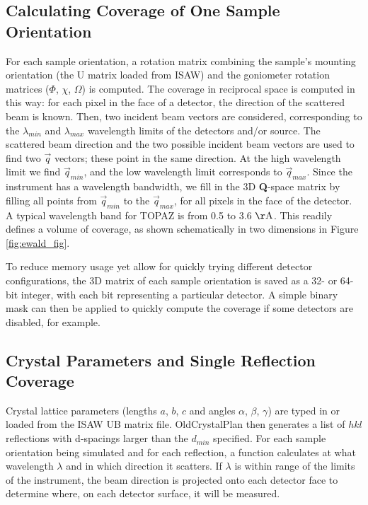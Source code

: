 \documentclass[final]{iucr}              %
\newcommand{\ang}{$\mathrm{\AA} $}
\begin{document}
\subsection{Calculating Coverage of One Sample Orientation}

For each sample orientation, a rotation matrix combining the sample's mounting
orientation (the U matrix loaded from ISAW) and the goniometer rotation matrices
($\Phi$, $\chi$, $\Omega$) is computed. The coverage in reciprocal space is
computed in this way: for each pixel in the face of a detector, the direction of
the scattered beam is known. Then, two incident beam vectors are considered,
corresponding to the $\lambda_{min}$ and $\lambda_{max}$ wavelength limits
of the detectors and/or source. The scattered beam direction and the two possible incident beam vectors
are used to find two $\overrightarrow q$ vectors; these point in the
same direction. At the high wavelength limit we find $\overrightarrow q_{min}$,
and the low wavelength limit corresponds to $\overrightarrow
q_{max}$. Since the instrument has a wavelength bandwidth, we fill in the 3D {\bf Q}-space
matrix by filling all points from $\overrightarrow q_{min}$ to the 
$\overrightarrow q_{max}$, for all pixels in the face of the detector.
A typical wavelength band for TOPAZ is from 0.5 to 3.6 \ang.
This readily defines a volume of coverage, as shown schematically in
two dimensions in Figure \ref{fig:ewald_fig}.


To reduce memory usage yet allow for quickly trying different detector
configurations, the 3D matrix of each sample orientation is saved as a 32- or
64-bit integer, with each bit representing a particular detector. A simple
binary mask can then be applied to quickly compute the coverage if some
detectors are disabled, for example.          




\subsection{Crystal Parameters and Single Reflection Coverage}

Crystal lattice parameters (lengths $a$, $b$, $c$ and angles $\alpha$, $\beta$,
$\gamma$) are typed in or loaded from the ISAW UB matrix file. OldCrystalPlan then
generates a list of $hkl$ reflections with d-spacings larger than the $d_{min}$
specified. For each sample orientation being simulated and for each reflection, a function calculates at
what wavelength $\lambda$ and in which direction it scatters. If $\lambda$ 
is within range of the limits of the instrument, the beam direction is projected
onto each detector face to determine where, on each detector surface, it will be
measured. 
 
\end{document}
